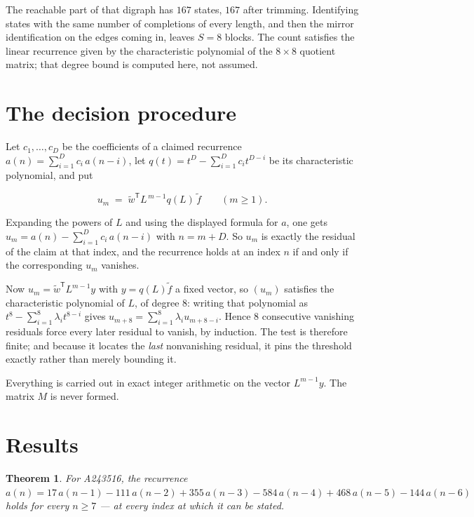 \documentclass[11pt]{article}
\newtheorem{theorem}{Theorem}
\theoremstyle{definition}
\begin{document}
The reachable part of that digraph has $167$ states, $167$ after trimming. Identifying states with the same number of completions of every length, and then the mirror identification on the edges coming in, leaves $S = 8$ blocks. The count satisfies the linear recurrence given by the characteristic polynomial of the $8\times8$ quotient matrix; that degree bound is computed here, not assumed.

\section{The decision procedure}

Let $c_1,\dots,c_D$ be the coefficients of a claimed recurrence $a(n) = \sum_{i=1}^{D} c_i\,a(n-i)$, let $q(t) = t^{D} - \sum_{i=1}^{D} c_i t^{D-i}$ be its characteristic polynomial, and put

\[u_m \;=\; \tilde w^{\mathsf T} L^{\,m-1} q(L)\,\tilde f \qquad (m \ge 1).\]

Expanding the powers of $L$ and using the displayed formula for $a$, one gets $u_m = a(n) - \sum_{i=1}^{D} c_i\,a(n-i)$ with $n = m + D$. So $u_m$ is exactly the residual of the claim at that index, and the recurrence holds at an index $n$ if and only if the corresponding $u_m$ vanishes.

Now $u_m = \tilde w^{\mathsf T} L^{m-1} y$ with $y = q(L)\tilde f$ a fixed vector, so $(u_m)$ satisfies the characteristic polynomial of $L$, of degree $8$: writing that polynomial as $t^{8} - \sum_{i=1}^{8} \lambda_i t^{8-i}$ gives $u_{m+8} = \sum_{i=1}^{8} \lambda_i u_{m+8-i}$. Hence $8$ consecutive vanishing residuals force every later residual to vanish, by induction. The test is therefore finite; and because it locates the {\itshape last} nonvanishing residual, it pins the threshold exactly rather than merely bounding it.

Everything is carried out in exact integer arithmetic on the vector $L^{m-1}y$. The matrix $M$ is never formed.

\section{Results}

\begin{theorem} For A243516, the recurrence $a(n) = 17\,a(n-1) - 111\,a(n-2) + 355\,a(n-3) - 584\,a(n-4) + 468\,a(n-5) - 144\,a(n-6)$ holds for every $n \ge 7$ --- at every index at which it can be stated.\end{theorem}
\end{document}
